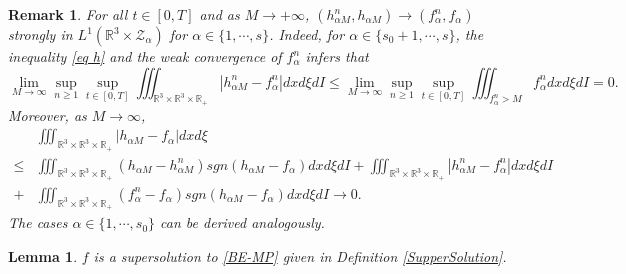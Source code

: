 \documentclass[reqno,11pt]{amsart}
\newtheorem{remark}{Remark}[section]
\newtheorem{lemma}{Lemma}[section]
\numberwithin{equation}{section}
\def\R{\mathbb{R}}
\begin{document}
\begin{remark}
  For all $t \in [0, T]$ and as $M \to + \infty$, $(h_{\alpha M}^n, h_{\alpha M} ) \to ( f^n_\alpha, f_\alpha )$ strongly in $L^1 (\R^3 \times \mathcal{Z}_\alpha)$ for $\alpha \in \{ 1, \cdots, s \}$. Indeed, for $\alpha \in \{s_0+1,\cdots,s\}$, the inequality \eqref{eq h} and the weak convergence of $f^n_\alpha$ infers that
  \begin{equation*}
\lim \limits_{M\rightarrow \infty}	\sup \limits_{n \geq 1} \sup \limits_{t\in [0,T]} \iiint_{ \R^3 \times \R^3 \times \R_+} |h^n_{\alpha M}-f^n_\alpha | dxd\xi dI \leq \lim \limits_{M\rightarrow \infty} \sup \limits_{n \geq 1} \sup \limits_{t\in [0,T]} \iiint_{f^n_\alpha >M } f^n_\alpha dxd\xi dI = 0.
\end{equation*}
Moreover, as $M\rightarrow \infty$,
\begin{equation}\label{hM to f}
	\begin{aligned}
		&\iiint_{ \R^3 \times \R^3 \times \R_+}|h_{\alpha M} -f_\alpha | dxd\xi \\
		\leq & \iiint_{ \R^3 \times \R^3 \times \R_+} (h_{\alpha M}-h^n_{\alpha M} )sgn (h_{\alpha M} -f_\alpha)dxd\xi dI + \iiint_{ \R^3 \times \R^3 \times \R_+} |h^n_{\alpha M}-f^n_\alpha | dxd\xi dI \\
		+  &\iiint_{ \R^3 \times \R^3 \times \R_+} (f^n_\alpha -f_\alpha) sgn (h_{\alpha M} -f_\alpha)dxd\xi dI \rightarrow 0.
	\end{aligned}
\end{equation}  
The cases $\alpha \in \{1,\cdots,s_0\}$ can be derived analogously.
\end{remark}

\begin{lemma}\label{theo-7.3}
	$f$ is a supersolution to \eqref{BE-MP} given in Definition \ref{SupperSolution}.
\end{lemma}
\end{document}
